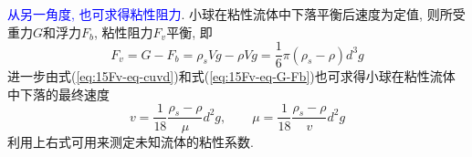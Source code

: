\begin{solution}
\noindent\textcolor{blue}{从另一角度, 也可求得粘性阻力}. 小球在粘性流体中下落平衡后速度为定值, 则所受重力$G$和浮力$F_b$, 粘性阻力$F_v$平衡, 即 
\begin{equation}\label{eq:15Fv-eq-G-Fb}
F_v = G - F_b = \rho_s V g - \rho V g = \frac{1}{6}\pi (\rho_s - \rho) d^3 g
\end{equation}
进一步由式(\ref{eq:15Fv-eq-cuvd})和式(\ref{eq:15Fv-eq-G-Fb})也可求得小球在粘性流体中下落的最终速度
\[
v = \frac{1}{18}\frac{\rho_s-\rho}{\mu} d^2 g, \qquad
\mu = \frac{1}{18}\frac{\rho_s-\rho}{v}d^2 g
\]
利用上右式可用来测定未知流体的粘性系数.
\end{solution}
